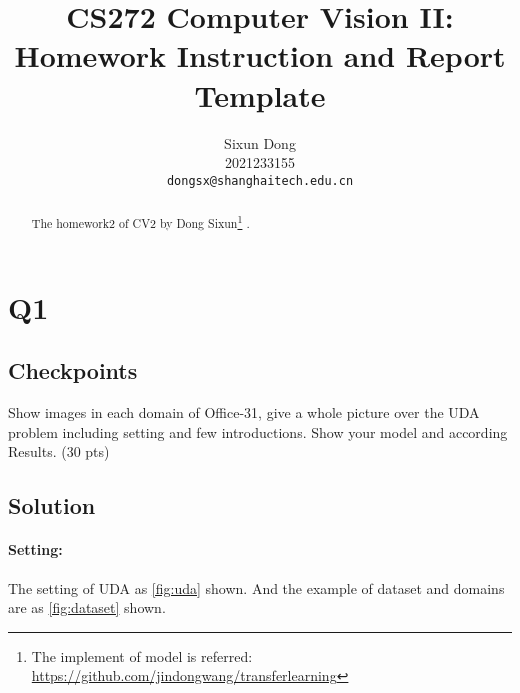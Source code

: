 \documentclass[10pt,twocolumn,letterpaper]{article}
\begin{document}
\title{CS272 Computer Vision II: \\ Homework Instruction and Report Template}

\author{Sixun Dong \\
2021233155\\
{\tt\small dongsx@shanghaitech.edu.cn}
}

\maketitle

\begin{abstract}
The homework2 of CV2 by Dong Sixun\footnote[1]{The implement of model is referred: \url{https://github.com/jindongwang/transferlearning}} . 
\end{abstract}

\section{Q1}
\subsection{Checkpoints}
Show images in each domain of Office-31, give a whole picture over the UDA problem including setting and few introductions. Show your model and according Results. (30 pts)

\subsection{Solution}
\paragraph{Setting:}
The setting of UDA as \cref{fig:uda} shown. And the example of dataset and domains are as \cref{fig:dataset} shown. 
\end{document}
